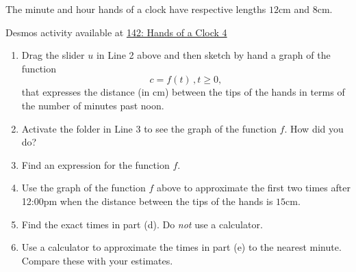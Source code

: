 \documentclass{ximera}
\begin{document}
\begin{question} \label{Q9eergFDhgL}
The minute and hour hands of a clock have respective lengths $12$cm and $8$cm. 

\begin{onlineOnly}
    \begin{center}
\end{center}
\end{onlineOnly}

Desmos activity available at \href{https://www.desmos.com/calculator/sl0k5pvb6h}{142: Hands of a Clock 4}

\begin{enumerate}
\item Drag the slider $u$ in Line 2 above and then sketch by hand a graph of the function
\[
    c = f(t) \, , t\geq 0 ,
\]
that expresses the distance (in cm) between the tips of the hands in terms of the number of minutes past noon.

\item Activate the folder in Line 3 to see the graph of the function $f$. How did you do?

\item Find an expression for the function $f$.

\item Use the graph of the function $f$ above to approximate the first two times after 12:00pm when the distance between the tips of the hands is $15$cm.

\item Find the exact times in part (d). Do \emph{not} use a calculator.

\item Use a calculator to approximate the times in part (e) to the nearest minute. Compare these with your estimates.
\end{enumerate}
\end{question}
\end{document}
